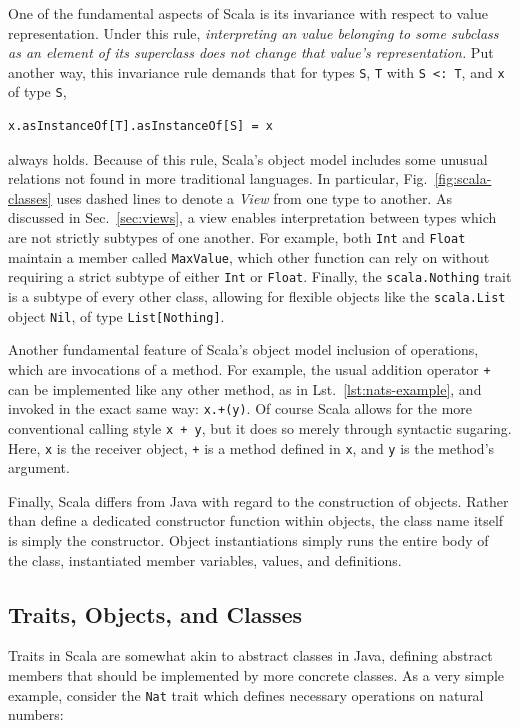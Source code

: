\documentclass[jou,apacite]{IEEEtran}
\begin{document}
One of the fundamental aspects of Scala is its invariance with respect to value
representation. Under this rule, \emph{interpreting an value belonging to some
  subclass as an element of its superclass does not change that value's
  representation.} Put another way, this invariance rule demands that for types
\texttt{S}, \texttt{T} with \texttt{S~<:~T}, and \texttt{x} of type \texttt{S},
\begin{verbatim}
x.asInstanceOf[T].asInstanceOf[S] = x
\end{verbatim}
always holds. Because of this rule, Scala's object model includes some unusual
relations not found in more traditional languages. In particular,
Fig.~\ref{fig:scala-classes} uses dashed lines to denote a \emph{View} from one
type to another. As discussed in Sec.~\ref{sec:views}, a view enables
interpretation between types which are not strictly subtypes of one another. For
example, both \texttt{Int} and \texttt{Float} maintain a member called
\texttt{MaxValue}, which other function can rely on without requiring a strict
subtype of either \texttt{Int} or \texttt{Float}. Finally, the
\texttt{scala.Nothing} trait is a subtype of every other class, allowing for
flexible objects like the \texttt{scala.List} object \texttt{Nil}, of type
\texttt{List[Nothing]}.

Another fundamental feature of Scala's object model inclusion of operations,
which are invocations of a method. For example, the usual addition operator
\texttt{+} can be implemented like any other method, as in
Lst.~\ref{lst:nats-example}, and invoked in the exact same way: \texttt{x.+(y)}.
Of course Scala allows for the more conventional calling style \texttt{x + y},
but it does so merely through syntactic sugaring. Here, \texttt{x} is the
receiver object, \texttt{+} is a method defined in \texttt{x}, and \texttt{y} is
the method's argument.

Finally, Scala differs from Java with regard to the construction of
objects. Rather than define a dedicated constructor function within objects, the
class name itself is simply the constructor. Object instantiations simply runs
the entire body of the class, instantiated member variables, values, and
definitions.

\subsection{Traits, Objects, and Classes}
\label{sec:traits-obj-cls}

Traits in Scala are somewhat akin to abstract classes in Java, defining abstract
members that should be implemented by more concrete classes. As a very simple
example, consider the \texttt{Nat} trait which defines necessary operations on
natural numbers: %
\begin{samepage}
  \inputminted{Scala}{../examples/ExampleNat.scala} %
\end{samepage}
\end{document}
